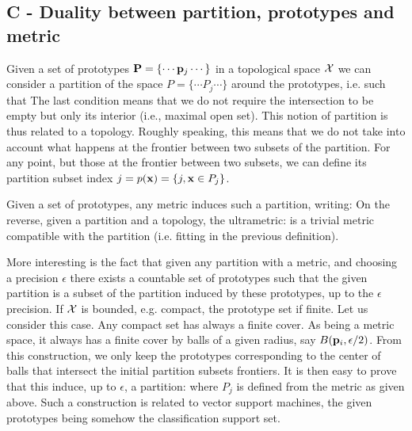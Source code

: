 \documentclass{article}\usepackage[width=17cm,height=22cm]{geometry}\usepackage[english]{babel} \usepackage[utf8]{inputenc}\usepackage{fancyvrb} \usepackage{authblk} \usepackage{amsmath}\usepackage{amsfonts} \usepackage{hyperref}\usepackage{outlines} \usepackage{graphicx} \usepackage{color}\DeclareGraphicsExtensions{.pdf,.png,.jpg}\definecolor{vthierry}{RGB}{80,0,120}\newcommand{\vthierry}[1]{{\color{vthierry}{#1}}}\definecolor{thalita}{RGB}{51, 153, 255}\newcommand{\thalita}[1]{{\color{thalita}{#1}}}
\begin{document}
\subsection*{C - Duality between partition, prototypes and metric}

Given a set of prototypes ${\bf P}=\{\cdots{\bf p}_j\cdots\}$ in a topological space ${\cal X}$ we can consider a  partition of the space $P = \{\cdots{P}_j\cdots\}$ around the prototypes, i.e. such that
The last condition means that we do not require the intersection to be empty but only its interior (i.e., maximal open set). This notion of partition is thus related to a topology. Roughly speaking, this means that we do not take into account what happens at the frontier between two subsets of the partition. 
For any point, but those at the frontier between two subsets, we can define its partition subset index $j = p({\bf x}) = \{j, {\bf x} \in P_j\}$.

Given a set of prototypes, any metric induces such a partition, writing:
On the reverse, given a partition and a topology, the ultrametric:
is a trivial metric compatible with the partition (i.e. fitting in the previous definition).

More interesting is the fact that given any partition with a metric, and choosing a precision $\epsilon$ there exists a countable set of prototypes such that the given partition is a subset of the partition induced by these prototypes, up to the $\epsilon$ precision. If ${\cal X}$ is bounded, e.g. compact, the prototype set if finite. Let us consider this case. Any compact set has always a finite cover. As being a metric space, it always has a finite cover by balls of a given radius, say $B({\bf p}_i, \epsilon/2)$. From this construction, we only keep the prototypes corresponding to the center of balls that intersect the initial partition subsets frontiers. It is then easy to prove that this induce, up to $\epsilon$, a partition:
where $P_j$ is defined from the metric as given above. Such a construction is related to vector support machines, the given prototypes being somehow the classification support set.
\end{document}

